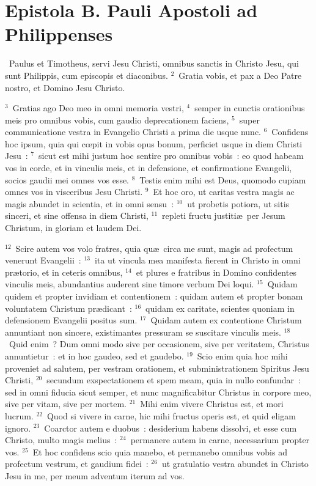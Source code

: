 {\centering \section*{Epistola B. Pauli Apostoli ad Philippenses}}\thispagestyle{empty}

~Paulus et Timotheus, servi Jesu Christi, omnibus sanctis in Christo Jesu, qui sunt Philippis, cum episcopis et diaconibus.
${}^{2}$~Gratia vobis, et pax a Deo Patre nostro, et Domino Jesu Christo.


${}^{3}$~Gratias ago Deo meo in omni memoria vestri,
${}^{4}$~semper in cunctis orationibus meis pro omnibus vobis, cum gaudio deprecationem faciens,
${}^{5}$~super communicatione vestra in Evangelio Christi a prima die usque nunc.
${}^{6}$~Confidens hoc ipsum, quia qui cœpit in vobis opus bonum, perficiet usque in diem Christi Jesu~:
${}^{7}$~sicut est mihi justum hoc sentire pro omnibus vobis~: eo quod habeam vos in corde, et in vinculis meis, et in defensione, et confirmatione Evangelii, socios gaudii mei omnes vos esse.
${}^{8}$~Testis enim mihi est Deus, quomodo cupiam omnes vos in visceribus Jesu Christi.
${}^{9}$~Et hoc oro, ut caritas vestra magis ac magis abundet in scientia, et in omni sensu~:
${}^{10}$~ut probetis potiora, ut sitis sinceri, et sine offensa in diem Christi,
${}^{11}$~repleti fructu justiti\ae\ per Jesum Christum, in gloriam et laudem Dei.


${}^{12}$~Scire autem vos volo fratres, quia qu\ae\ circa me sunt, magis ad profectum venerunt Evangelii~:
${}^{13}$~ita ut vincula mea manifesta fierent in Christo in omni pr\ae torio, et in ceteris omnibus,
${}^{14}$~et plures e fratribus in Domino confidentes vinculis meis, abundantius auderent sine timore verbum Dei loqui.
${}^{15}$~Quidam quidem et propter invidiam et contentionem~: quidam autem et propter bonam voluntatem Christum pr\ae dicant~:
${}^{16}$~quidam ex caritate, scientes quoniam in defensionem Evangelii positus sum.
${}^{17}$~Quidam autem ex contentione Christum annuntiant non sincere, existimantes pressuram se suscitare vinculis meis.
${}^{18}$~Quid enim~? Dum omni modo sive per occasionem, sive per veritatem, Christus annuntietur~: et in hoc gaudeo, sed et gaudebo.
${}^{19}$~Scio enim quia hoc mihi proveniet ad salutem, per vestram orationem, et subministrationem Spiritus Jesu Christi,
${}^{20}$~secundum exspectationem et spem meam, quia in nullo confundar~: sed in omni fiducia sicut semper, et nunc magnificabitur Christus in corpore meo, sive per vitam, sive per mortem.
${}^{21}$~Mihi enim vivere Christus est, et mori lucrum.
${}^{22}$~Quod si vivere in carne, hic mihi fructus operis est, et quid eligam ignoro.
${}^{23}$~Coarctor autem e duobus~: desiderium habens dissolvi, et esse cum Christo, multo magis melius~:
${}^{24}$~permanere autem in carne, necessarium propter vos.
${}^{25}$~Et hoc confidens scio quia manebo, et permanebo omnibus vobis ad profectum vestrum, et gaudium fidei~:
${}^{26}$~ut gratulatio vestra abundet in Christo Jesu in me, per meum adventum iterum ad vos.


